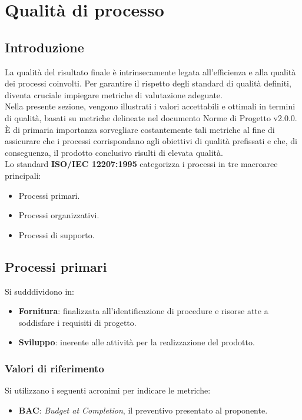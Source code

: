 \section{Qualità di processo}
\subsection{Introduzione}
La qualità del risultato finale è intrinsecamente legata all'efficienza e alla qualità dei processi coinvolti. 
Per garantire il rispetto degli standard di qualità definiti, diventa cruciale impiegare metriche di valutazione adeguate.\\
Nella presente sezione, vengono illustrati i valori accettabili e ottimali in termini di qualità, basati su metriche delineate nel documento Norme di Progetto v2.0.0. \\
È di primaria importanza sorvegliare costantemente tali metriche al fine di assicurare che i processi corrispondano agli obiettivi di qualità prefissati e che, di conseguenza, il prodotto conclusivo risulti di elevata qualità.\\

\noindent
Lo standard \textbf{ISO/IEC 12207:1995} categorizza i processi in tre macroaree principali:
\begin{itemize}
    \item Processi primari.
    \item Processi organizzativi.
    \item Processi di supporto.
\end{itemize}


\subsection{Processi primari}
Si sudddividono in:
\begin{itemize}
    \item \textbf{Fornitura}: finalizzata all'identificazione di procedure e risorse atte a soddisfare i requisiti di progetto.
    \item \textbf{Sviluppo}: inerente alle attività per la realizzazione del prodotto.
\end{itemize}

\subsubsection{Valori di riferimento}
Si utilizzano i seguenti acronimi per indicare le metriche:
\begin{itemize}
    \item \textbf{BAC}: \textit{Budget at Completion}, il preventivo presentato al proponente.
\end{itemize}

